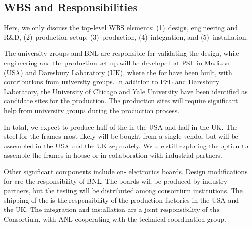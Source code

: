 \subsection{WBS and Responsibilities}
\label{sec:fdsp-apa-org-wbs}

Here, we only discuss the top-level WBS elements: (1)~design, engineering and R\&D, (2)~production setup, (3)~production, (4)~integration, and (5)~installation.

The university groups and BNL are responsible for validating  the design, while engineering and the production set up will be developed at PSL in Madison (USA)  and Daresbury Laboratory (UK), where the  for  have been built, with contributions from university groups.  In addition to PSL and Daresbury Laboratory, the University of Chicago and Yale University have been identified as candidate sites for the production. The production sites will require significant help from university groups during the production process. 

In total, we expect to produce half of the  in the USA and half in the UK. The steel for the frames most likely will be bought from a single vendor but will be assembled in the USA and the UK separately. We are still exploring the option to assemble the frames in house or in collaboration with industrial partners. 

Other significant components include on- electronics boards. Design modifications for  are the responsibility of BNL. The boards will be produced by industry partners, but the testing will be distributed among consortium institutions. The shipping of the  is the responsibility of the production factories in the USA and the UK.  The integration and installation are a joint responsibility of the Consortium, with ANL cooperating with the technical coordination group.

